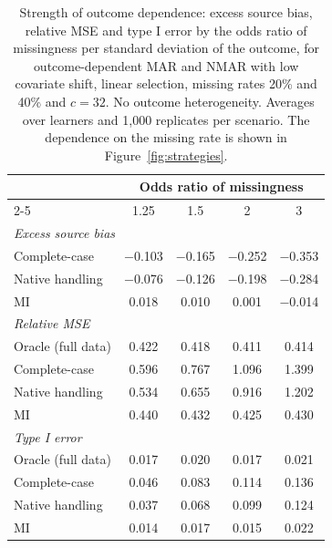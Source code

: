 \begin{table}[ht]
\centering
\caption{Strength of outcome dependence: excess source bias, relative MSE and type I error by the odds ratio of missingness per standard deviation of the outcome, for outcome-dependent MAR and NMAR with low covariate shift, linear selection, missing rates 20\% and 40\% and $c = 32$. No outcome heterogeneity. Averages over learners and 1{,}000 replicates per scenario. The dependence on the missing rate is shown in Figure~\ref{fig:strategies}.}
\label{tab:dose}
\begin{tabular}{lcccc}
\toprule
 & \multicolumn{4}{c}{Odds ratio of missingness} \\
\cmidrule(lr){2-5}
 & 1.25 & 1.5 & 2 & 3 \\
\midrule
\multicolumn{5}{l}{\textit{Excess source bias}} \\
\quad Complete-case & $-$0.103 & $-$0.165 & $-$0.252 & $-$0.353 \\
\quad Native handling & $-$0.076 & $-$0.126 & $-$0.198 & $-$0.284 \\
\quad MI & 0.018 & 0.010 & 0.001 & $-$0.014 \\
\multicolumn{5}{l}{\textit{Relative MSE}} \\
\quad Oracle (full data) & 0.422 & 0.418 & 0.411 & 0.414 \\
\quad Complete-case & 0.596 & 0.767 & 1.096 & 1.399 \\
\quad Native handling & 0.534 & 0.655 & 0.916 & 1.202 \\
\quad MI & 0.440 & 0.432 & 0.425 & 0.430 \\
\multicolumn{5}{l}{\textit{Type I error}} \\
\quad Oracle (full data) & 0.017 & 0.020 & 0.017 & 0.021 \\
\quad Complete-case & 0.046 & 0.083 & 0.114 & 0.136 \\
\quad Native handling & 0.037 & 0.068 & 0.099 & 0.124 \\
\quad MI & 0.014 & 0.017 & 0.015 & 0.022 \\
\bottomrule
\end{tabular}
\end{table}

